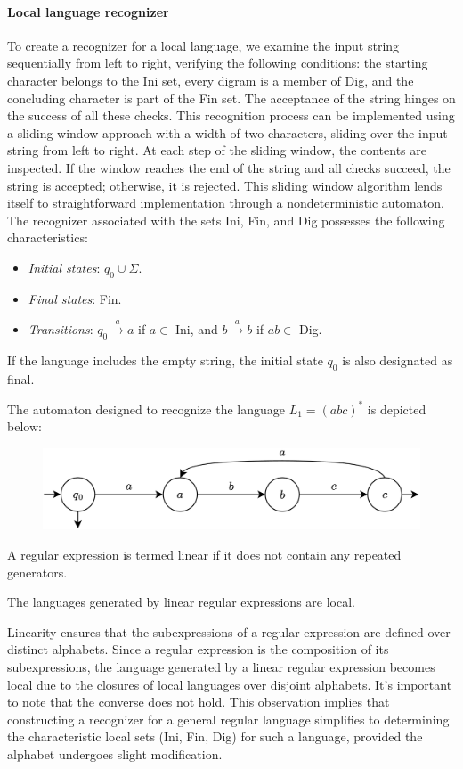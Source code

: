 \paragraph*{Local language recognizer}
To create a recognizer for a local language, we examine the input string sequentially from left to right, verifying the following conditions: the starting character belongs to the Ini set, every digram is a member of Dig, and the concluding character is part of the Fin set. 
The acceptance of the string hinges on the success of all these checks.
This recognition process can be implemented using a sliding window approach with a width of two characters, sliding over the input string from left to right. 
At each step of the sliding window, the contents are inspected. 
If the window reaches the end of the string and all checks succeed, the string is accepted; otherwise, it is rejected. 
This sliding window algorithm lends itself to straightforward implementation through a nondeterministic automaton.
The recognizer associated with the sets Ini, Fin, and Dig possesses the following characteristics:
\begin{itemize}
    \item \textit{Initial states}: $q_0 \cup \Sigma$.
    \item \textit{Final states}: Fin.
    \item \textit{Transitions}: $q_0 \overset{a}{\rightarrow}a$ if $a \in$ Ini, and $b \overset{a}{\rightarrow}b$ if $ab \in$ Dig.
\end{itemize}
If the language includes the empty string, the initial state $q_0$ is also designated as final.
\begin{example}
    The automaton designed to recognize the language $L_1=(abc)^{*}$ is depicted below: 
    \begin{figure}[H]
        \centering
        \includegraphics[width=0.75\linewidth]{images/local.png}
    \end{figure}
\end{example}
\begin{definition}
    A regular expression is termed linear if it does not contain any repeated generators.
\end{definition}
\begin{property}
    The languages generated by linear regular expressions are local. 
\end{property}
Linearity ensures that the subexpressions of a regular expression are defined over distinct alphabets. 
Since a regular expression is the composition of its subexpressions, the language generated by a linear regular expression becomes local due to the closures of local languages over disjoint alphabets. 
It's important to note that the converse does not hold.
This observation implies that constructing a recognizer for a general regular language simplifies to determining the characteristic local sets (Ini, Fin, Dig) for such a language, provided the alphabet undergoes slight modification.

